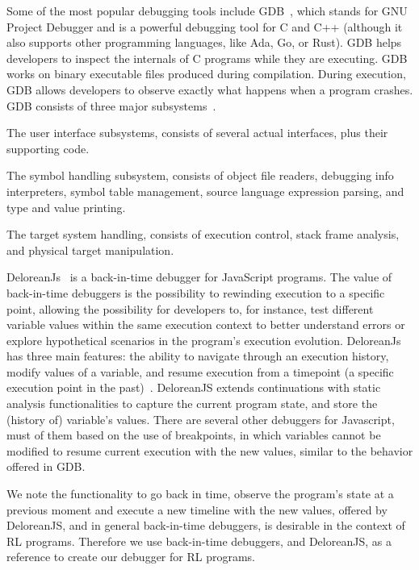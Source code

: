 Some of the most popular debugging tools include \ac{GDB}~\cite{stallman11}, 
which stands for GNU Project Debugger and is a powerful 
debugging tool for C and C++ (although it also supports other programming languages,
like Ada, Go, or Rust). GDB helps developers to inspect the internals of C programs while 
they are executing. \ac{GDB} works on binary executable files produced during compilation. During 
execution, \ac{GDB} allows developers to observe exactly what happens when a program 
crashes. \ac{GDB} consists of three major subsystems~\cite{stallman11}. 
\begin{enumerate*}[label=(\arabic*)] 
\item The user interface subsystems, consists of several actual interfaces, plus their supporting code. 
\item The symbol handling subsystem, consists of object file readers, debugging info interpreters, 
symbol table management, source language expression parsing, and type and value printing. 
\item The target system handling, consists of execution control, stack frame analysis, and 
physical target manipulation.
\end{enumerate*}

DeloreanJs~\cite{leger23} is a back-in-time debugger for JavaScript programs. The value of 
back-in-time debuggers is the possibility to rewinding execution to a specific point, allowing the 
possibility for developers to, for instance, test different variable values within the same execution 
context to better understand errors or explore hypothetical scenarios in the program's execution 
evolution. DeloreanJs has three main features: the ability to navigate through an execution history, 
modify values of a variable, and resume execution from a timepoint (a specific execution point in the 
past)~\cite{leger23}. DeloreanJS extends continuations with static analysis functionalities to capture 
the current program state, and store the (history of) variable's values. 
There are several other debuggers for Javascript, must of them based on the use of breakpoints, in 
which variables cannot be modified to resume current execution with the new values, similar to the 
behavior offered in \ac{GDB}.

We note the functionality to go back in time, observe the program's state at a previous moment and 
execute a new timeline with the new values, offered by DeloreanJS, and in general back-in-time 
debuggers, is desirable in the context of \ac{RL} programs. Therefore we use  back-in-time 
debuggers, and DeloreanJS, as a reference to create our debugger for \ac{RL} programs.


